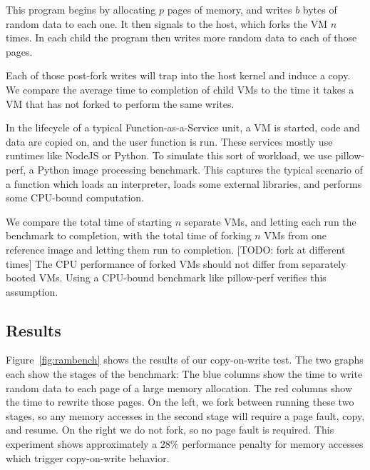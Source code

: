This program begins by allocating $p$ pages of memory, and writes $b$ bytes of
random data to each one. It then signals to the host, which forks the VM $n$
times. In each child the program then writes more random data to each of those
pages.

Each of those post-fork writes will trap into the host kernel and induce a
copy. We compare the average time to completion of child VMs to the time it
takes a VM that has not forked to perform the same writes.


In the lifecycle of a typical Function-as-a-Service unit, a VM is started, code
and data are copied on, and the user function is run. These services mostly use
runtimes like NodeJS or Python. To simulate this sort of workload, we use
pillow-perf, a Python image processing benchmark. This captures the typical
scenario of a function which loads an interpreter, loads some external
libraries, and performs some CPU-bound computation.

We compare the total time of starting $n$ separate VMs, and letting each run
the benchmark to completion, with the total time of forking $n$ VMs from one
reference image and letting them run to completion. [TODO: fork at different
times] The CPU performance of forked VMs should not differ from separately
booted VMs. Using a CPU-bound benchmark like pillow-perf verifies this
assumption.

\subsection{Results}



Figure~\ref{fig:rambench} shows the results of our copy-on-write test. The two
graphs each show the stages of the benchmark: The blue columns show the time to
write random data to each page of a large memory allocation. The red columns
show the time to rewrite those pages. On the left, we fork between running
these two stages, so any memory accesses in the second stage will require a
page fault, copy, and resume. On the right we do not fork, so no page fault is
required. This experiment shows approximately a 28\% performance penalty for
memory accesses which trigger copy-on-write behavior.

%
